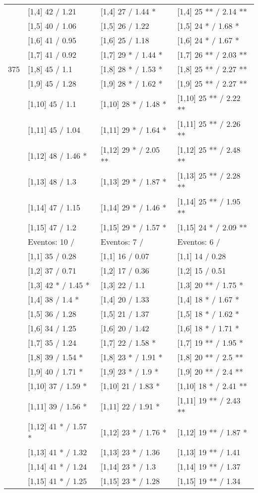 \begin{table}
\begin{tabular}[t]{llll}
\addlinespace
 & {}[1,4] 42  / 1.21 & {}[1,4] 27  / 1.44 * & {}[1,4] 25 ** / 2.14 **\\
 & {}[1,5] 40  / 1.06 & {}[1,5] 26  / 1.22 & {}[1,5] 24 * / 1.68 *\\
 & {}[1,6] 41  / 0.95 & {}[1,6] 25  / 1.18 & {}[1,6] 24 * / 1.67 *\\
 & {}[1,7] 41  / 0.92 & {}[1,7] 29 * / 1.44 * & {}[1,7] 26 ** / 2.03 **\\
375 & {}[1,8] 45  / 1.1 & {}[1,8] 28 * / 1.53 * & {}[1,8] 25 ** / 2.27 **\\
\addlinespace
 & {}[1,9] 45  / 1.28 & {}[1,9] 28 * / 1.62 * & {}[1,9] 25 ** / 2.27 **\\
 & {}[1,10] 45  / 1.1 & {}[1,10] 28 * / 1.48 * & {}[1,10] 25 ** / 2.22 **\\
 & {}[1,11] 45  / 1.04 & {}[1,11] 29 * / 1.64 * & {}[1,11] 25 ** / 2.26 **\\
 & {}[1,12] 48  / 1.46 * & {}[1,12] 29 * / 2.05 ** & {}[1,12] 25 ** / 2.48 **\\
 & {}[1,13] 48  / 1.3 & {}[1,13] 29 * / 1.87 * & {}[1,13] 25 ** / 2.28 **\\
\addlinespace
 & {}[1,14] 47  / 1.15 & {}[1,14] 29 * / 1.46 * & {}[1,14] 25 ** / 1.95 **\\
 & {}[1,15] 47  / 1.2 & {}[1,15] 29 * / 1.57 * & {}[1,15] 24 * / 2.09 **\\
 & Eventos:  10 / & Eventos:  7 / & Eventos:  6 /\\
 & {}[1,1] 35  / 0.28 & {}[1,1] 16  / 0.07 & {}[1,1] 14  / 0.28\\
 & {}[1,2] 37  / 0.71 & {}[1,2] 17  / 0.36 & {}[1,2] 15  / 0.51\\
\addlinespace
 & {}[1,3] 42 * / 1.45 * & {}[1,3] 22  / 1.1 & {}[1,3] 20 ** / 1.75 *\\
 & {}[1,4] 38  / 1.4 * & {}[1,4] 20  / 1.33 & {}[1,4] 18 * / 1.67 *\\
 & {}[1,5] 36  / 1.28 & {}[1,5] 21  / 1.37 & {}[1,5] 18 * / 1.62 *\\
 & {}[1,6] 34  / 1.25 & {}[1,6] 20  / 1.42 & {}[1,6] 18 * / 1.71 *\\
 & {}[1,7] 35  / 1.24 & {}[1,7] 22  / 1.58 * & {}[1,7] 19 ** / 1.95 *\\
\addlinespace
500 & {}[1,8] 39  / 1.54 * & {}[1,8] 23 * / 1.91 * & {}[1,8] 20 ** / 2.5 **\\
 & {}[1,9] 40  / 1.71 * & {}[1,9] 23 * / 1.9 * & {}[1,9] 20 ** / 2.4 **\\
 & {}[1,10] 37  / 1.59 * & {}[1,10] 21  / 1.83 * & {}[1,10] 18 * / 2.41 **\\
 & {}[1,11] 39  / 1.56 * & {}[1,11] 22  / 1.91 * & {}[1,11] 19 ** / 2.43 **\\
 & {}[1,12] 41 * / 1.57 * & {}[1,12] 23 * / 1.76 * & {}[1,12] 19 ** / 1.87 *\\
\addlinespace
 & {}[1,13] 41 * / 1.32 & {}[1,13] 23 * / 1.36 & {}[1,13] 19 ** / 1.41\\
 & {}[1,14] 41 * / 1.24 & {}[1,14] 23 * / 1.3 & {}[1,14] 19 ** / 1.37\\
 & {}[1,15] 41 * / 1.25 & {}[1,15] 23 * / 1.28 & {}[1,15] 19 ** / 1.34\\
\bottomrule
\end{tabular}
\end{table}
